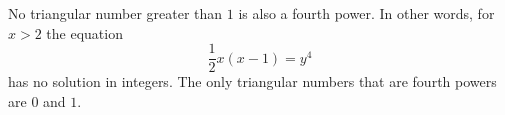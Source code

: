 No triangular number greater than $1$ is also a fourth power. In other words, for $x > 2$ the equation
$$
\frac{1}{2}x(x-1) = y^4
$$
has no solution in integers. The only triangular numbers that are fourth powers are $0$ and $1$.
